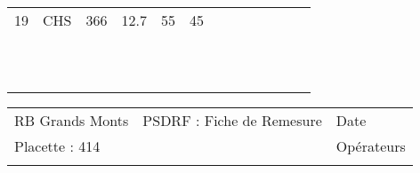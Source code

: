 \documentclass[a4paper, landscape]{article}\usepackage[]{graphicx}\usepackage[]{color}
\begin{document}
{\begin{tabular}{|p{1cm}|p{2cm}|p{1.6cm}|p{1.6cm}|p{1.6cm}|p{1.6cm}|p{1.5cm}|p{1.5cm}|p{1.5cm}|p{1.5cm}|p{1.5cm}|p{7.5cm}|p{5cm}|}
19 & CHS & 366 & 12.7 & 55 & 45 &  &  &  &  &  &  &  \\ 
   \rowcolor[gray]{0.95} \hline
 &  &  &  &  &  &  &  &  &  &  &  &  \\ 
   \hline
 &  &  &  &  &  &  &  &  &  &  &  &  \\ 
   \rowcolor[gray]{0.95} \hline
 &  &  &  &  &  &  &  &  &  &  &  &  \\ 
   \hline
 &  &  &  &  &  &  &  &  &  &  &  &  \\ 
   \rowcolor[gray]{0.95} \hline
 &  &  &  &  &  &  &  &  &  &  &  &  \\ 
   \hline
 &  &  &  &  &  &  &  &  &  &  &  &  \\ 
   \rowcolor[gray]{0.95} \hline
 &  &  &  &  &  &  &  &  &  &  &  &  \\ 
   \hline
 &  &  &  &  &  &  &  &  &  &  &  &  \\ 
   \rowcolor[gray]{0.95} \hline
 &  &  &  &  &  &  &  &  &  &  &  &  \\ 
   \hline
 &  &  &  &  &  &  &  &  &  &  &  &  \\ 
   \rowcolor[gray]{0.95} \hline
 &  &  &  &  &  &  &  &  &  &  &  &  \\ 
   \hline
\end{tabular}
}

\begin{tabular}{p{10cm}p{10cm}p{8cm}}
  RB Grands Monts & PSDRF : Fiche de Remesure & Date \\ 
  Placette : 414 &  & Opérateurs \\ 
   &  &  \\ 
  \end{tabular}
\end{document}
